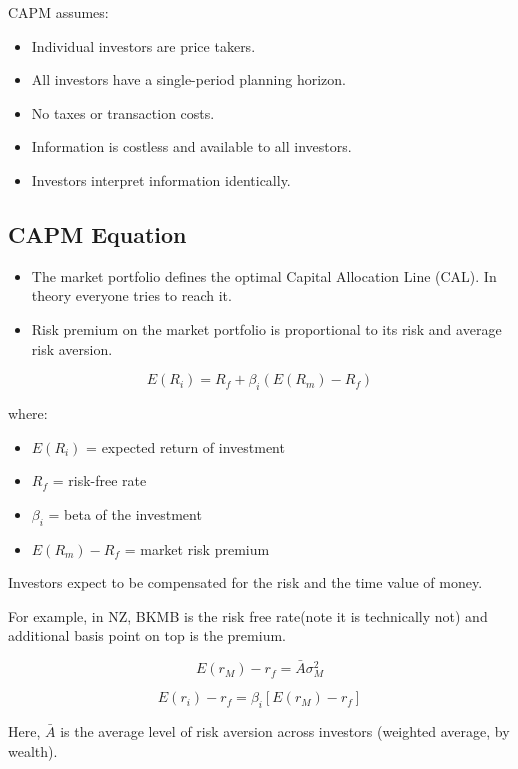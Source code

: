 \documentclass[
]{book}
\providecommand{\tightlist}{%
  \setlength{\itemsep}{0pt}\setlength{\parskip}{0pt}}
\begin{document}
CAPM assumes:

\begin{itemize}
\tightlist
\item
  Individual investors are price takers.
\item
  All investors have a single-period planning horizon.
\item
  No taxes or transaction costs.
\item
  Information is costless and available to all investors.
\item
  Investors interpret information identically.
\end{itemize}

\hypertarget{capm-equation}{%
\subsection{CAPM Equation}\label{capm-equation}}

\begin{itemize}
\item
  The market portfolio defines the optimal Capital Allocation Line (CAL). In theory everyone tries to reach it.
\item
  Risk premium on the market portfolio is proportional to its risk and average risk aversion.
\end{itemize}

\[
E(R_i) = R_f + \beta_i (E(R_m) - R_f)
\]

where:

\begin{itemize}
\tightlist
\item
  \(E(R_i)\) = expected return of investment
\item
  \(R_f\) = risk-free rate
\item
  \(\beta_i\) = beta of the investment
\item
  \(E(R_m) - R_f\) = market risk premium
\end{itemize}

Investors expect to be compensated for the risk and the time value of money.

For example, in NZ, BKMB is the risk free rate(note it is technically not) and additional basis point on top is the premium.

\[
E(r_M) - r_f = \bar{A} \sigma_M^2
\]

\[
E(r_i) - r_f = \beta_i [E(r_M) - r_f]
\]

Here, \(\bar{A}\) is the average level of risk aversion across investors (weighted average, by wealth).
\end{document}
